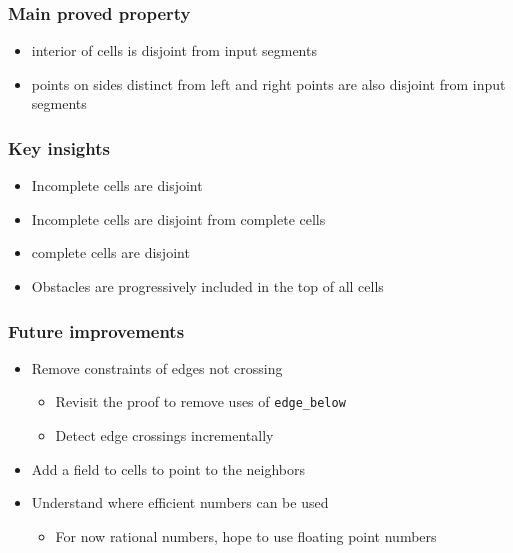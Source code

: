 \documentclass[compress]{beamer}
\begin{document}
\begin{frame}
\frametitle{Main proved property}
\begin{itemize}
\item interior of cells is disjoint from input segments
\item points on sides distinct from left and right points are also disjoint from
 input segments
\end{itemize}
\end{frame}
\begin{frame}
\frametitle{Key insights}
\begin{itemize}
\item Incomplete cells are disjoint
\item Incomplete cells are disjoint from complete cells
\item complete cells are disjoint
\item Obstacles are progressively included in the top of all cells
\end{itemize}
\end{frame}
\begin{frame}
\frametitle{Future improvements}
\begin{itemize}
\item Remove constraints of edges not crossing
\begin{itemize}
\item Revisit the proof to remove uses of {\tt edge\_below}
\item Detect edge crossings incrementally
\end{itemize}
\item Add a field to cells to point to the neighbors
\item Understand where efficient numbers can be used
\begin{itemize}
\item For now rational numbers, hope to use floating point numbers
\end{itemize}
\end{itemize}
\end{frame}
\end{document}
